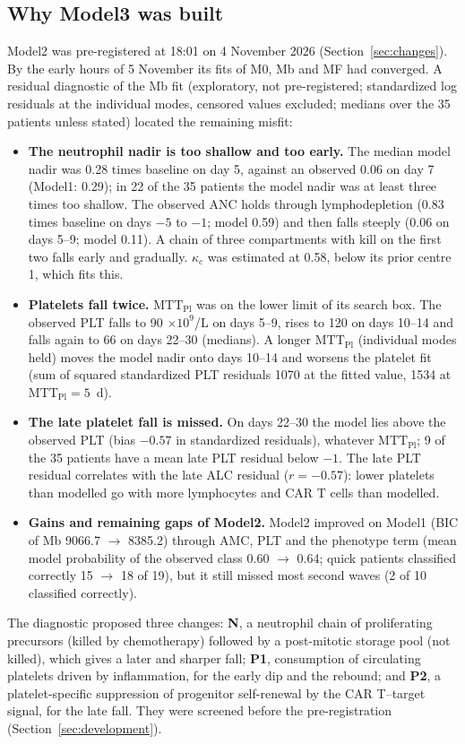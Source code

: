 \documentclass[11pt]{article}
\begin{document}
\subsection{Why Model3 was built}\label{sec:why}
Model2 was pre-registered at 18:01 on 4 November 2026 (Section~\ref{sec:changes}). By the early hours of 5 November its fits of M0, Mb and MF had converged. A residual diagnostic of the Mb fit (exploratory, not pre-registered; standardized log residuals at the individual modes, censored values excluded; medians over the 35 patients unless stated) located the remaining misfit:
\begin{itemize}
\item \textbf{The neutrophil nadir is too shallow and too early.} The median model nadir was 0.28 times baseline on day 5, against an observed 0.06 on day 7 (Model1: 0.29); in 22 of the 35 patients the model nadir was at least three times too shallow. The observed ANC holds through lymphodepletion (0.83 times baseline on days $-5$ to $-1$; model 0.59) and then falls steeply (0.06 on days 5--9; model 0.11). A chain of three compartments with kill on the first two falls early and gradually. $\kappa_c$ was estimated at 0.58, below its prior centre 1, which fits this.
\item \textbf{Platelets fall twice.} $\mathrm{MTT}_{\mathrm{Pl}}$ was on the lower limit of its search box. The observed PLT falls to 90 $\times10^9$/L on days 5--9, rises to 120 on days 10--14 and falls again to 66 on days 22--30 (medians). A longer $\mathrm{MTT}_{\mathrm{Pl}}$ (individual modes held) moves the model nadir onto days 10--14 and worsens the platelet fit (sum of squared standardized PLT residuals 1070 at the fitted value, 1534 at $\mathrm{MTT}_{\mathrm{Pl}}=5$~d).
\item \textbf{The late platelet fall is missed.} On days 22--30 the model lies above the observed PLT (bias $-0.57$ in standardized residuals), whatever $\mathrm{MTT}_{\mathrm{Pl}}$; 9 of the 35 patients have a mean late PLT residual below $-1$. The late PLT residual correlates with the late ALC residual ($r=-0.57$): lower platelets than modelled go with more lymphocytes and CAR T cells than modelled.
\item \textbf{Gains and remaining gaps of Model2.} Model2 improved on Model1 (BIC of Mb 9066.7 $\to$ 8385.2) through AMC, PLT and the phenotype term (mean model probability of the observed class 0.60 $\to$ 0.64; quick patients classified correctly 15 $\to$ 18 of 19), but it still missed most second waves (2 of 10 classified correctly).
\end{itemize}
The diagnostic proposed three changes: \textbf{N}, a neutrophil chain of proliferating precursors (killed by chemotherapy) followed by a post-mitotic storage pool (not killed), which gives a later and sharper fall; \textbf{P1}, consumption of circulating platelets driven by inflammation, for the early dip and the rebound; and \textbf{P2}, a platelet-specific suppression of progenitor self-renewal by the CAR T--target signal, for the late fall. They were screened before the pre-registration (Section~\ref{sec:development}).
\end{document}
